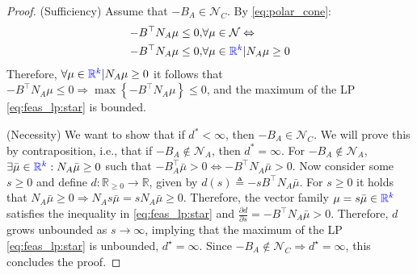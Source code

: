 \documentclass[letterpaper, 10 pt, conference]{ieeeconf}  %
\begin{document}
\begin{proof}
    (Sufficiency) Assume that $-B_A\in \mathcal{N}_C$. By \eqref{eq:polar_cone}: 
    \begin{equation}
    \begin{split}
        -B^\top N_A \mu \leq 0, &\forall \mu \in \mathcal{N}\Leftrightarrow \\
         -B^\top N_A \mu \leq 0, &\forall \mu \in {\color{blue}\mathbb{R}^k}| N_A \mu \geq 0
    \end{split}
    \end{equation}
    Therefore, $\forall \mu \in {\color{blue}\mathbb{R}^k}| N_A \mu \geq 0$ it follows that $-B^\top N_A \mu \leq 0 \Rightarrow \max\left\{  -B^\top N_A \mu \right\}\leq 0$, and the {\color{blue}maximum of the} LP \eqref{eq:feas_lp:star} is bounded. 
    \par 
    (Necessity) We want to show that if $d^*<\infty$, then $-B_A \in \mathcal N_C $. We will prove this by contraposition, i.e., that if $-B_A \notin \mathcal{N}_A$, then {\color{blue}$d^*=\infty$}. For $-B_A \notin \mathcal{N}_A $, $\exists \bar{\mu}\in{\color{blue}\mathbb{R}^k}:N_A\bar{\mu}\geq 0$ such that $-B_A^\top \bar{\mu} > 0 \Leftrightarrow -B^\top  N_A \bar{\mu} > 0$.
    Now consider some $s\geq 0$ and define $d:\mathbb{R}_{\geq 0} \rightarrow \mathbb{R}$, given by $d(s) \triangleq  -s  B^\top N_A \bar{\mu} $. For $s\geq 0$ it holds that $N_A \bar{\mu} \geq 0 \Rightarrow N_A s \bar{\mu} = s N _A \bar{\mu}  \geq 0$. Therefore, the vector family $\mu = s\bar{\mu} \in {\color{blue}\mathbb{R}^k}$ satisfies the inequality in \eqref{eq:feas_lp:star} and $\frac{\partial d}{\partial s} =  -B^\top N_A \bar{\mu} > 0$. Therefore, $d$ grows unbounded as $s\rightarrow\infty$, implying that the {\color{blue}maximum of the} LP \eqref{eq:feas_lp:star} is unbounded, $d^\star=\infty$. Since  $-B_A \notin \mathcal{N}_C \Rightarrow d^\star = \infty$, this concludes the proof. 
\end{proof}
\end{document}
